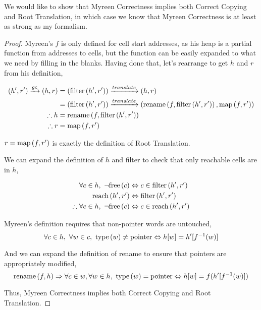 \begin{theorem}
  We would like to show that Myreen Correctness implies both Correct
  Copying and Root Translation, in which case we know that Myreen
  Correctness is at least as strong as my formalism.

  \begin{proof}
    Myreen's $f$ is only defined for cell start addresses, as his heap
    is a partial function from addresses to cells, but the function
    can be easily expanded to what we need by filling in the
    blanks. Having done that, let's rearrange to get $h$ and $r$ from
    his definition,

    \begin{align*}
      (h', r') \xrightarrow{gc} (h, r) &= (\mathrm{filter}\left(h', r'\right)) \xrightarrow{translate} (h, r)\\
      &= (\mathrm{filter}\left(h', r'\right)) \xrightarrow{translate} (\mathrm{rename}\left(f, \mathrm{filter}\left(h', r'\right)\right), \mathrm{map}\left(f, r'\right))\\
      \therefore h &= \mathrm{rename}\left(f, \mathrm{filter}\left(h', r'\right)\right)\\
      \therefore r &= \mathrm{map}\left(f, r'\right)
    \end{align*}

    $r = \mathrm{map}\left(f, r'\right)$ is exactly the definition of Root Translation.

    We can expand the definition of $h$ and filter to check that only
    reachable cells are in $h$,

    \begin{align*}
      \forall c \in h,\ \lnot\mathrm{free}\left(c\right) &\Leftrightarrow c \in \mathrm{filter}\left(h', r'\right)\\
      \mathrm{reach}\left(h', r'\right) &\Leftrightarrow \mathrm{filter}\left(h', r'\right)\\
      \therefore \forall c \in h,\ \lnot\mathrm{free}\left(c\right) &\Leftrightarrow c \in \mathrm{reach}\left(h', r'\right)
    \end{align*}

    Myreen's definition requires that non-pointer words are
    untouched, \[\forall c \in h,\ \forall w \in c,\ \type{w}
    \neq \typointer \iff h[w] = h'[f^{-1}(w)]\]

    And we can expand the definition of rename to ensure that pointers
    are appropriately modified, \[\mathrm{rename}\left(f, h\right) \Rightarrow \forall c \in
    w, \forall w \in h,\ \mathrm{type}\left(w\right) = \mathrm{pointer} \Leftrightarrow h[w]
    = f(h'[f^{-1}(w)])\]

    Thus, Myreen Correctness implies both Correct Copying and Root
    Translation.
  \end{proof}
\end{theorem}

